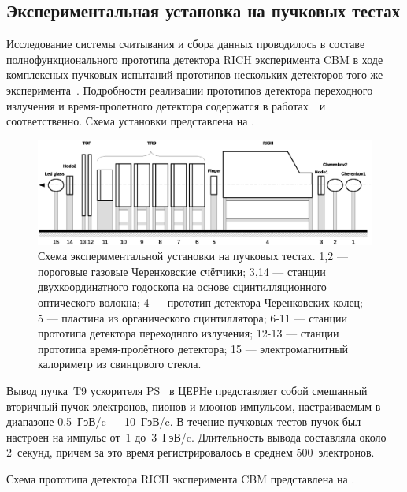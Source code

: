 \subsection{Экспериментальная установка на пучковых тестах}\label{section:secBeamtimeSetup}

Исследование системы считывания и сбора данных проводилось в составе полнофункционального прототипа детектора RICH эксперимента CBM в ходе комплексных пучковых испытаний прототипов нескольких детекторов того же эксперимента~\cite{BEAMTIME}. Подробности реализации прототипов детектора переходного излучения и время-пролетного детектора содержатся в работах~\cite{TRDBEAMTIME}~и~\cite{TOFBEAMTIME} соответственно. Схема установки представлена на .

\begin{figure}[H]
\includegraphics[width=1.0\textwidth]{pictures/9_Beamtime_setup_Full.eps}
\caption{Схема экспериментальной установки на пучковых тестах. 1,2 --- пороговые газовые Черенковские счётчики; 3,14 --- станции двухкоординатного годоскопа на основе сцинтилляционного оптического волокна; 4 --- прототип детектора Черенковских колец; 5 --- пластина из органического сцинтиллятора; 6-11 --- станции прототипа детектора переходного излучения; 12-13 --- станции прототипа время-пролётного детектора; 15 --- электромагнитный калориметр из свинцового стекла.}
\label{fig:Beamtime}
\end{figure}

Вывод пучка~T9 ускорителя PS~\cite{CERNPST9} в ЦЕРНе представляет собой смешанный вторичный пучок электронов, пионов и мюонов импульсом, настраиваемым в диапазоне 0.5~ГэВ/c --- 10~ГэВ/c. В течение пучковых тестов пучок был настроен на импульс от~1 до~3~ГэВ/c. Длительность вывода составляла около 2~секунд, причем за это время регистрировалось в среднем 500~электронов.

Схема прототипа детектора RICH эксперимента CBM представлена на .

